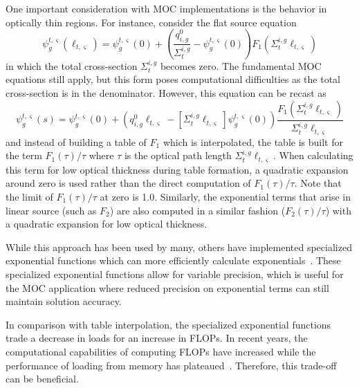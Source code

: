One important consideration with \ac{MOC} implementations is the behavior in optically thin regions. For instance, consider the flat source equation
\begin{equation*}
	\psi_g^{t,\varsigma}(\ell_{t,\varsigma}) = \psi^{t,\varsigma}_g(0) + \left( \frac{q^0_{i,g}}{\Sigma_{t}^{i,g}} - \psi_g^{t,\varsigma}(0) \right) F_1\left(\Sigma_{t}^{i,g} \ell_{t,\varsigma} \right)
\end{equation*}
in which the total cross-section $\Sigma_{t}^{i,g}$ becomes zero. The fundamental \ac{MOC} equations still apply, but this form poses computational difficulties as the total cross-section is in the denominator. However, this equation can be recast as
\begin{equation}
	\psi_g^{t,\varsigma}(s) = \psi^{t,\varsigma}_g(0) + \left(q^0_{i,g} \ell_{t,\varsigma} - \left[\Sigma_{t}^{i,g} \ell_{t,\varsigma}\right]\psi_g^{t,\varsigma}(0) \right) \frac{F_1\left(\Sigma_{t}^{i,g} \ell_{t,\varsigma} \right)}{\Sigma_{t}^{i,g} \ell_{t,\varsigma}}
\end{equation}
and instead of building a table of $F_1$ which is interpolated, the table is built for the term $F_1(\tau) / \tau$ where $\tau$ is the optical path length $\Sigma_{t}^{i,g} \ell_{t,\varsigma}$. When calculating this term for low optical thickness during table formation, a quadratic expansion around zero is used rather than the direct computation of $F_1(\tau) / \tau$. Note that the limit of $F_1(\tau) / \tau$ at zero is 1.0. Similarly, the exponential terms that arise in linear source (such as $F_2$) are also computed in a similar fashion ($F_2(\tau) / \tau$) with a quadratic expansion for low optical thickness.

While this approach has been used by many, others have implemented specialized exponential functions which can more efficiently calculate exponentials~\cite{colin-exp}. These specialized exponential functions allow for variable precision, which is useful for the \ac{MOC} application where reduced precision on exponential terms can still maintain solution accuracy. 

In comparison with table interpolation, the specialized exponential functions trade a decrease in loads for an increase in \acp{FLOP}. In recent years, the computational capabilities of computing \acp{FLOP} have increased while the performance of loading from memory has plateaued~\cite{Patterson_1997}. Therefore, this trade-off can be beneficial.

